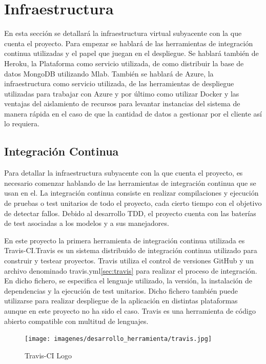 \documentclass[a4paper,11pt]{book}
\begin{document}
 
\section{Infraestructura}

En esta sección se detallará la infraestructura virtual subyacente con la que cuenta el proyecto. Para empezar se hablará de las herramientas de integración continua utilizadas y el papel que juegan en el despliegue. Se hablará también de Heroku, la Plataforma como servicio utilizada, de como distribuir la base de datos MongoDB utilizando Mlab. También se hablará de Azure, la infraestructura como servicio utilizada, de las herramientas de despliegue utilizadas para trabajar con Azure y por último como utilizar Docker y las ventajas del aislamiento de recursos para levantar instancias del sistema de manera rápida en el caso de que la cantidad de datos a gestionar por el cliente así lo requiera. 

\subsection{Integración Continua}

Para detallar la infraestructura subyacente con la que cuenta el proyecto, es necesario comenzar hablando de las herramientas de integración continua que se usan en el. La integración continua consiste en realizar compilaciones y ejecución de pruebas o test unitarios de todo el proyecto, cada cierto tiempo con el objetivo de detectar fallos. Debido al desarrollo TDD, el proyecto cuenta con las baterías de test asociadas a los modelos y a sus manejadores.

En este proyecto la primera herramienta de integración continua utilizada es Travis-CI\cite{travis}.Travis es un  sistema distribuido de integración continua utilizado para construir y testear proyectos. Travis utiliza el control de versiones GitHub y un archivo denominado travis.yml\ref{sec:travis} para realizar el proceso de integración. En dicho fichero, se especifica el lenguaje utilizado, la versión, la instalación de dependencias y la ejecución de test unitarios. Dicho fichero también puede utilizarse para realizar despliegue de la aplicación en distintas plataformas aunque en este proyecto no ha sido el caso. Travis es una herramienta de código abierto compatible con multitud de lenguajes. 

\begin{figure}[H] 
\centering 
\texttt{[image: imagenes/desarrollo\_herramienta/travis.jpg]}
\caption{ Travis-CI Logo\cite{travisL}  }  
\end{figure} 
\end{document}
